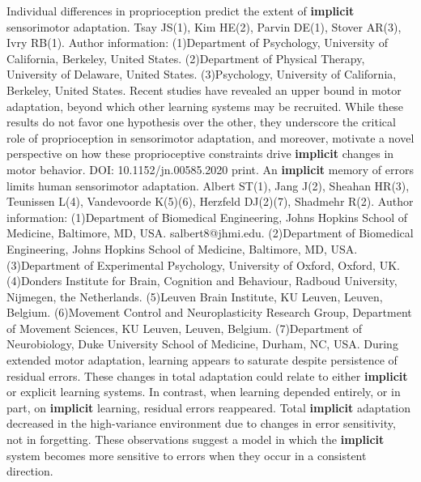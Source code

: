 \documentclass[11pt]{article}
\begin{document}
\newline  [  76  ]   Individual differences in proprioception predict the extent of   \textbf {  implicit  }    sensorimotor adaptation.  Tsay JS(1), Kim HE(2), Parvin DE(1), Stover AR(3), Ivry RB(1).  Author information: (1)Department of Psychology, University of California, Berkeley, United States. (2)Department of Physical Therapy, University of Delaware, United States. (3)Psychology, University of California, Berkeley, United States.  Recent studies have revealed an upper bound in motor adaptation, beyond which  other learning systems may be recruited.
\newline  [  77  ]   While these results do not favor one hypothesis over  the other, they underscore the critical role of proprioception in sensorimotor  adaptation, and moreover, motivate a novel perspective on how these  proprioceptive constraints drive   \textbf {  implicit  }   changes in motor behavior.  DOI: 10.1152/jn.00585.2020
\newline  [  78  ]  print.  An   \textbf {  implicit  }   memory of errors limits human sensorimotor adaptation.  Albert ST(1), Jang J(2), Sheahan HR(3), Teunissen L(4), Vandevoorde K(5)(6),  Herzfeld DJ(2)(7), Shadmehr R(2).  Author information: (1)Department of Biomedical Engineering, Johns Hopkins School of Medicine,  Baltimore, MD, USA. salbert8@jhmi.edu. (2)Department of Biomedical Engineering, Johns Hopkins School of Medicine,  Baltimore, MD, USA. (3)Department of Experimental Psychology, University of Oxford, Oxford, UK. (4)Donders Institute for Brain, Cognition and Behaviour, Radboud University,  Nijmegen, the Netherlands. (5)Leuven Brain Institute, KU Leuven, Leuven, Belgium. (6)Movement Control and Neuroplasticity Research Group, Department of Movement  Sciences, KU Leuven, Leuven, Belgium. (7)Department of Neurobiology, Duke University School of Medicine, Durham, NC,  USA.  During extended motor adaptation, learning appears to saturate despite  persistence of residual errors.
\newline  [  79  ]   These changes in total adaptation could relate to either   \textbf {  implicit  }   or  explicit learning systems.
\newline  [  80  ]   In contrast, when learning depended entirely, or in  part, on   \textbf {  implicit  }   learning, residual errors reappeared.
\newline  [  81  ]   Total   \textbf {  implicit  }    adaptation decreased in the high-variance environment due to changes in error  sensitivity, not in forgetting.
\newline  [  82  ]   These observations suggest a model in which the    \textbf {  implicit  }   system becomes more sensitive to errors when they occur in a consistent  direction.
\end{document}
